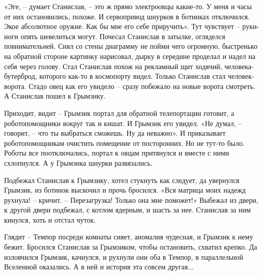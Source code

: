 \documentclass[ebook,oneside,final,openright]{memoir}
\begin{document}
\par
«Эге, – думает Станислав, – это ж прямо электроовцы какие-то. У меня и часы от них остановились, похоже. И сервопривод шнурков в ботинках отключился. Экое абсолютное оружие. Как бы мне его себе приручить». Тут чувствует – руки-ноги опять шевелиться могут. Почесал Станислав в затылке, огляделся повнимательней. Снял со стены диаграмму не пойми чего огромную, быстренько на обратной стороне картинку нарисовал, дырку в середине проделал и надел на себя через голову. Стал Станислав похож на рекламный щит ходячий, человека-бутерброд, которого как-то в космопорту видел. Только Станислав стал человек-ворота. Стадо овец как его увидело – сразу побежало на новые ворота смотреть. А Станислав пошел к Грымзику.\par
\par
Приходит, видит – Грымзик портал для обратной телепортации готовит, а роботопомощники вокруг так и кишат. И Грымзик его увидел. «Не думал, – говорит, – что ты выбраться сможешь. Ну да неважно». И приказывает роботопомощникам очистить помещение от посторонних. Но не тут-то было. Роботы все поотключались, портал к овцам притянулся и вместе с ними схлопнулся. А у Грымзика шнурки развязались.\par
\par
Подбежал Станислав к Грымзику, хотел стукнуть как следует, да увернулся Грымзик, из ботинок выскочил и прочь бросился. «Вся матрица моих надежд рухнула! – кричит. – Перезагрузка! Только она мне поможет!» Выбежал из двери, к другой двери подбежал, с котлом ядерным, и шасть за нее. Станислав за ним кинулся, хоть и отстал чуток.\par
\par
Глядит – Темпор посреди комнаты сияет, аномалия чудесная, и Грымзик к нему бежит. Бросился Станислав за Грымзиком, чтобы остановить, схватил крепко. Да изловчился Грымзик, качнулся, и рухнули они оба в Темпор, в параллельной Вселенной оказались. А в ней и история эта совсем другая...\par
\end{document}
